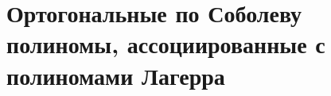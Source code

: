 \chapter{Ортогональные по Соболеву полиномы, ассоциированные с полиномами Лагерра}

\cite{Tref1,Tref2,SolDmEg,Pash}
%
